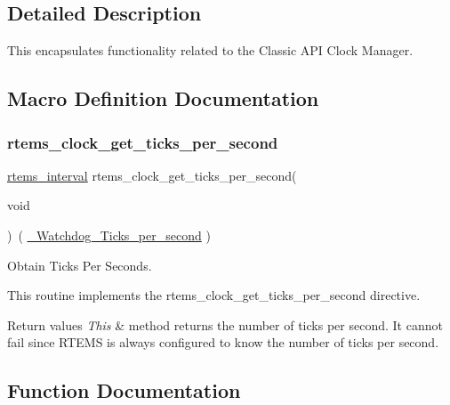 \subsection{Detailed Description}
This encapsulates functionality related to the Classic A\+PI Clock Manager. 

\subsection{Macro Definition Documentation}
\mbox{\label{group__ClassicClock_ga1d0420ca59ffc8108c7db6d7e07dced7}} 
\subsubsection{\texorpdfstring{rtems\_clock\_get\_ticks\_per\_second}{rtems\_clock\_get\_ticks\_per\_second}}
{\footnotesize\ttfamily \mbox{\hyperlink{group__ClassicTasks_gad39c43f949683d46874e3a5586b93aee}{rtems\+\_\+interval}} rtems\+\_\+clock\+\_\+get\+\_\+ticks\+\_\+per\+\_\+second(\begin{DoxyParamCaption}\item[{}]{void }\end{DoxyParamCaption})~( \mbox{\hyperlink{group__RTEMSScoreWatchdog_ga637504d63c75c4648a19dd000b8326b8}{\+\_\+\+Watchdog\+\_\+\+Ticks\+\_\+per\+\_\+second}} )}



Obtain Ticks Per Seconds. 

This routine implements the rtems\+\_\+clock\+\_\+get\+\_\+ticks\+\_\+per\+\_\+second directive.


\begin{DoxyRetVals}{Return values}
{\em This} & method returns the number of ticks per second. It cannot fail since R\+T\+E\+MS is always configured to know the number of ticks per second. \\
\hline
\end{DoxyRetVals}


\subsection{Function Documentation}
\mbox{\label{group__ClassicClock_gab5bfb9a415bb9cbb6c9132d8b3de8f61}} 
